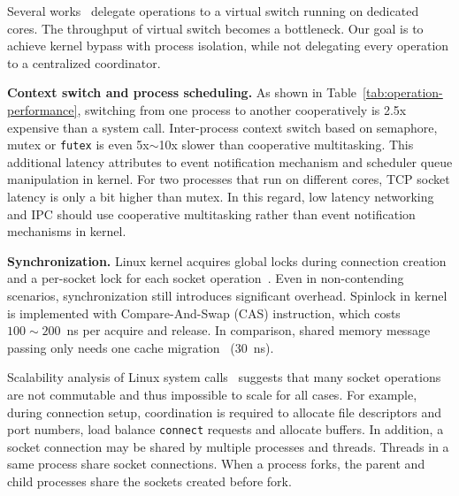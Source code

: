 Several works~\cite{martins2014clickos,roghanchi2017ffwd,huang2017high} delegate operations to a virtual switch running on dedicated cores. The throughput of virtual switch becomes a bottleneck. Our goal is to achieve kernel bypass with process isolation, while not delegating every operation to a centralized coordinator.

\textbf{Context switch and process scheduling.}
As shown in Table~\ref{tab:operation-performance}, switching from one process to another cooperatively is 2.5x expensive than a system call. Inter-process context switch based on semaphore, mutex or \texttt{futex} is even 5x$\sim$10x slower than cooperative multitasking. This additional latency attributes to event notification mechanism and scheduler queue manipulation in kernel. For two processes that run on different cores, TCP socket latency is only a bit higher than mutex. In this regard, low latency networking and IPC should use cooperative multitasking rather than event notification mechanisms in kernel.

\textbf{Synchronization.}
Linux kernel acquires global locks during connection creation and a per-socket lock for each socket operation~\cite{boyd2010analysis,han2012megapipe,lin2016scalable}. Even in non-contending scenarios, synchronization still introduces significant overhead. Spinlock in kernel is implemented with Compare-And-Swap (CAS) instruction, which costs $100\sim200$~ns per acquire and release. In comparison, shared memory message passing only needs one cache migration~\cite{roghanchi2017ffwd} (30~ns).

Scalability analysis of Linux system calls~\cite{boyd2010analysis,clements2015scalable} suggests that many socket operations are not commutable and thus impossible to scale for all cases. For example, during connection setup, coordination is required to allocate file descriptors and port numbers, load balance \texttt{connect} requests and allocate buffers. In addition, a socket connection may be shared by multiple processes and threads. Threads in a same process share socket connections. When a process forks, the parent and child processes share the sockets created before fork.

